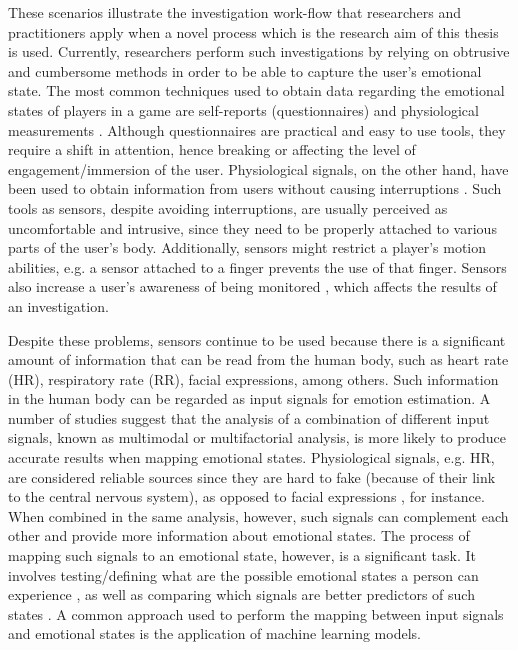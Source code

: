 These scenarios illustrate the investigation work-flow that researchers and practitioners apply when a novel process which is the research aim of this thesis is used. Currently, researchers perform such investigations by relying on obtrusive and cumbersome methods in order to be able to capture the user's emotional state. The most common techniques used to obtain data regarding the emotional states of players in a game are self-reports (questionnaires) and physiological measurements \parencite{mekler2014systematic}. Although questionnaires are practical and easy to use tools, they require a shift in attention, hence breaking or affecting the level of engagement/immersion of the user. Physiological signals, on the other hand, have been used to obtain information from users without causing interruptions \parencite{bousefsaf2013remote,yun2009game,rani2006empirical,tijs2008dynamic}. Such tools as sensors, despite avoiding interruptions, are usually perceived as uncomfortable and intrusive, since they need to be properly attached to various parts of the user's body. Additionally, sensors might restrict a player's motion abilities, e.g. a sensor attached to a finger prevents the use of that finger. Sensors also increase a user's awareness of being monitored \parencite{yamakoshi2007preliminary,yamaguchi2006evaluation,healey2005detecting}, which affects the results of an investigation.


Despite these problems, sensors continue to be used because there is a significant amount of information that can be read from the human body, such as heart rate (HR), respiratory rate (RR), facial expressions, among others. Such information in the human body can be regarded as input signals for emotion estimation. A number of studies \parencite{kukolja2014comparative} suggest that the analysis of a combination of different input signals, known as multimodal or multifactorial analysis, is more likely to produce accurate results when mapping emotional states. Physiological signals, e.g. HR, are considered reliable sources since they are hard to fake (because of their link to the central nervous system), as opposed to facial expressions \parencite{Landowska}, for instance. When combined in the same analysis, however, such signals can complement each other and provide more information about emotional states. The process of mapping such signals to an emotional state, however, is a significant task. It involves testing/defining what are the possible emotional states a person can experience \parencite{mandryk2006continuous}, as well as comparing which signals are better predictors of such states \parencite{jerritta2011physiological}. A common approach used to perform the mapping between input signals and emotional states is the application of machine learning models.

